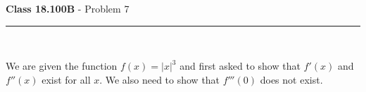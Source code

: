 \documentclass[11pt,reqno]{article}
\begin{document}
\vspace{15pt}
\begin{flushleft} 
\textbf{Class 18.100B} - Problem 7\\
\rule{500pt}{1pt}\\
\end{flushleft} 

We are given the function $f(x) = |x|^3$ and first asked to show that $f'(x)$ and $f''(x)$ exist for all $x$. We also need to show that $f'''(0)$ does not exist.


\end{document}
